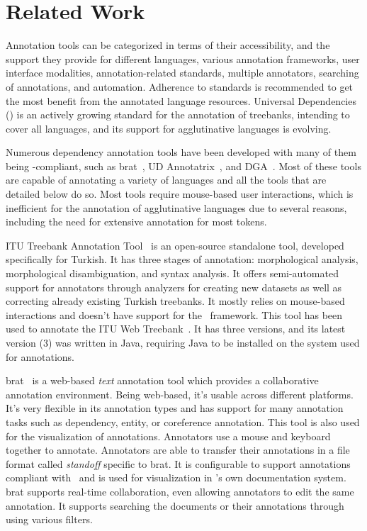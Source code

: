 \section{Related Work}
\label{sec:related}

Annotation tools can be categorized in terms of their accessibility, and the support they provide for different languages, various annotation frameworks, user interface modalities, annotation-related standards, multiple annotators, searching of annotations, and automation.
Adherence to standards is recommended to get the most benefit from the annotated language resources.
Universal Dependencies~\cite{ud} (\ud) is an actively growing standard for the annotation of treebanks, intending to cover all languages, and its support for agglutinative languages is evolving.

Numerous dependency annotation tools have been developed with many of them being \ud-compliant, such as brat~\cite{brat}, UD Annotatrix~\cite{ud-annotatrix}, and DGA~\cite{dgannotator}.
Most of these tools are capable of annotating a variety of languages and all the tools that are detailed below do so.
Most tools require mouse-based user interactions, which is inefficient for the annotation of agglutinative languages due to several reasons, including the need for extensive annotation for most tokens.

ITU Treebank Annotation Tool~\cite{itu-annotation-tool} is an open-source standalone tool, developed specifically for Turkish.
It has three stages of annotation: morphological analysis, morphological disambiguation, and syntax analysis.
It offers semi-automated support for annotators through analyzers for creating new datasets as well as correcting already existing Turkish treebanks.
It mostly relies on mouse-based interactions and doesn't have support for the \ud\ framework.
This tool has been used to annotate the ITU Web Treebank~\cite{itu-annotation-tool}. %
It has three versions, and its latest version (3) was written in Java, requiring Java to be installed on the system used for annotations.

brat~\cite{brat} is a web-based \textit{text} annotation tool which provides a collaborative annotation environment.
Being web-based, it's usable across different platforms.
It's very flexible in its annotation types and has support for many annotation tasks such as dependency, entity, or coreference annotation.
This tool is also used for the visualization of annotations.
Annotators use a mouse and keyboard together to annotate.
Annotators are able to transfer their annotations in a file format called \textit{standoff} specific to brat.
It is configurable to support annotations compliant with \ud\ and is used for visualization in \ud's own documentation system.
brat supports real-time collaboration, even allowing annotators to edit the same annotation.
It supports searching the documents or their annotations through using various filters.

